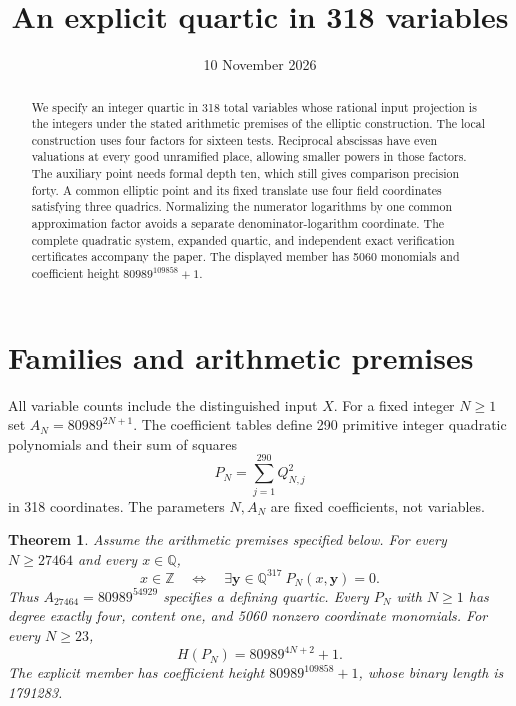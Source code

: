 \documentclass[11pt,a4paper]{article}
\title{An explicit quartic in 318 variables}
\author{}\date{10 November 2026}
\newtheorem{theorem}{Theorem}[section]
\theoremstyle{remark}\newtheorem{remark}[theorem]{Remark}
\newcommand{\Q}{\mathbb Q}\newcommand{\Z}{\mathbb Z}\newcommand{\HH}{\mathcal H}
\begin{document}
\maketitle
\begin{abstract}
We specify an integer quartic in 318 total variables whose rational input
projection is the integers under the stated arithmetic premises of the
elliptic construction. The local construction uses four factors for
sixteen tests. Reciprocal abscissas have even valuations at every good
unramified place, allowing smaller powers in those factors. The auxiliary
point needs formal depth ten, which still gives comparison precision
forty. A common elliptic point and its fixed translate use four field
coordinates satisfying three quadrics. Normalizing the numerator
logarithms by one common approximation factor avoids a separate
denominator-logarithm coordinate. The complete quadratic system,
expanded quartic, and independent
exact verification certificates accompany the paper. The displayed
member has 5060 monomials and coefficient height $80989^{109858}+1$.
\end{abstract}

\section{Families and arithmetic premises}
All variable counts include the distinguished input $X$. For a fixed
integer $N\ge1$ set $A_N=80989^{2N+1}$. The coefficient tables define 290 primitive integer quadratic
polynomials and their sum of squares
\[
                     P_N=\sum_{j=1}^{290}Q_{N,j}^2
\]
in 318 coordinates. The parameters $N,A_N$ are fixed coefficients,
not variables.

\begin{theorem}\label{thm:families}
Assume the arithmetic premises specified below. For every $N\ge27464$
and every $x\in\Q$,
\[
 x\in\Z\quad\Longleftrightarrow\quad
 \exists\mathbf y\in\Q^{317}\ P_N(x,\mathbf y)=0.
\]
Thus $A_{27464}=80989^{54929}$ specifies a defining quartic.
Every $P_N$ with $N\ge1$ has degree exactly four, content one, and
5060 nonzero coordinate monomials. For every $N\ge23$,
\[
                         H(P_N)=80989^{4N+2}+1.
\]
The explicit member has coefficient height $80989^{109858}+1$,
whose binary length is 1791283.
\end{theorem}
\end{document}
